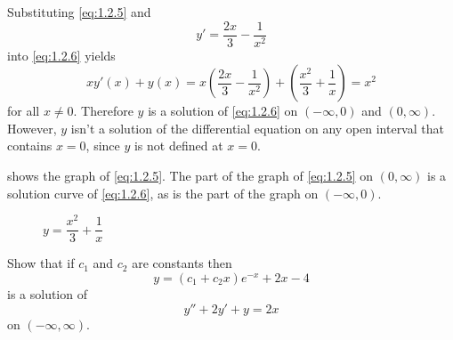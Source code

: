 \begin{solution}
Substituting \eqref{eq:1.2.5} and
\[
y'=\frac{2x}{3} - \frac{1}{x^2}
\]
into \eqref{eq:1.2.6}  yields
\[
xy'(x)+y(x)=x \left(\frac{2x}{3} - \frac{1}{x^2}\right)+
\left(\frac{x^2}{3}+\frac{1}{x}\right)=x^2
\]
for all $x\ne0$. Therefore $y$ is a solution of \eqref{eq:1.2.6}
on $(-\infty,0)$ and $(0,\infty)$.
 However, $y$ isn't  a solution of the differential
equation on any open interval that contains $x=0$, since  $y$ is
not defined at  $x=0$.
\end{solution}

 shows the graph
of \eqref{eq:1.2.5}. The
part
of the graph of \eqref{eq:1.2.5} on $(0,\infty)$ is a solution curve of
\eqref{eq:1.2.6}, as is the part of the graph on $(-\infty,0)$.

\begin{figure}
  \centering
  \caption{$y=\dfrac{x^{2}}{3}+\dfrac{1}{x}$}
  \label{figure:1.2.1}
\end{figure}

\begin{example}\label{example:1.2.3}
 Show that if $c_1$ and $c_2$ are constants then
\begin{equation} \label{eq:1.2.7}
y=(c_1+c_2x)e^{-x}+2x-4
\end{equation}
 is a solution of
\begin{equation} \label{eq:1.2.8}
y''+2y'+y=2x
\end{equation}
 on $(-\infty,\infty)$.
\end{example}

